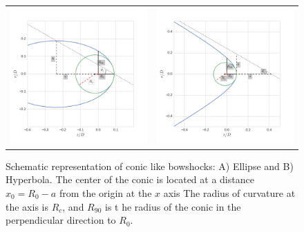 \begin{figure}
\setlength\tabcolsep{0pt}
\begin{tabular}{cc}
\includegraphics[height=0.54\linewidth, trim=30 0 30 0, clip]{ellipse_py} &
\includegraphics[height=0.54\linewidth, trim=60 0 70 0, clip]{hyperbola_py}
\end{tabular}
\label{fig:conics}
\caption{Schematic representation of conic like bowshocks: A) Ellipse and B) Hyperbola.
  The center of the conic is located at a distance $x_0=R_0-a$ from the origin at the $x$ axis 
  The radius of curvature at the axis is $R_c$, and $R_{90}$ is t he radius of the conic in the
  perpendicular direction to $R_0$.
}
\end{figure}
